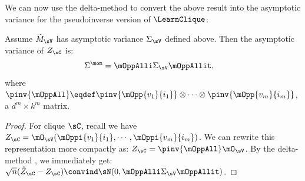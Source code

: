 
We can now use the delta-method to convert the above result into 
the asymptotic variance for the pseudoinverse version of $\LearnClique$:
\begin{lemma}
  \label{lem:mom-variance}  
  Assume $\hat M_{\sV}$ has asymptotic variance $\Sigma_\sV$ defined above.
  Then the asymptotic variance of $Z_\sC$ is:
  \begin{align*}
    \Sigma^{\mom} &= \mOppAlli \Sigma_\sV \mOppAllit,
  \end{align*}
  where $\pinv{\mOppAll} \eqdef \pinv{\mOpp{v_1}{i_1}} \otimes
  \cdots \otimes \pinv{\mOpp{v_m}{i_m}}$, a $d^m \times k^m$ matrix.
\end{lemma}
\begin{proof}
For clique $\sC$, recall we have
  $Z_{\sC} = \mO_\sV(\mOppi{v_1}{i_1},\cdots,\mOppi{v_m}{i_m})$.
We can rewrite this representation more compactly as: $Z_{\sC} = \pinv{\mOppAll} \mO_\sV$.
By the delta-method \cite{vaart98asymptotic},
we immediately get:
$\sqrt{n}(\hat Z_\sC - Z_\sC) \convind \sN(0, \mOppAlli \Sigma_\sV \mOppAllit)$.
\end{proof}


